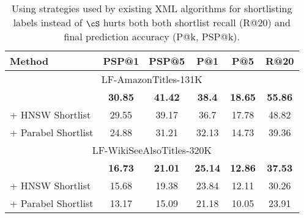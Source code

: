 \begin{table}
\caption{Using strategies used by existing XML algorithms for shortlisting labels instead of $\cS$ hurts both both shortlist recall (R@20) and final prediction accuracy (P@k, PSP@k).}
    \label{tab:sub:xmlclass}
    \centering
    \begin{tabular}{@{}l|cc|cc|c@{}}
        \toprule
        \textbf{Method}
        & \textbf{PSP@1}  & \textbf{PSP@5} & \textbf{P@1}  & \textbf{P@5} &\textbf{R@20}\\
        \midrule
\multicolumn{6}{c}{LF-AmazonTitles-131K}\\ \midrule					
\alg	 & \textbf{30.85}	 & \textbf{41.42}	 & \textbf{38.4}	 & \textbf{18.65}	 & \textbf{55.86} \\
\midrule
+ HNSW Shortlist	 & 29.55	 & 39.17	 & 36.7	 & 17.78	 & 48.82 \\
+ Parabel Shortlist	 & 24.88	 & 31.21	 & 32.13	 & 14.73	 & 39.36 \\
\midrule
\multicolumn{6}{c}{LF-WikiSeeAlsoTitles-320K}\\ \midrule			
\alg	 & \textbf{16.73}	 & \textbf{21.01}	 & \textbf{25.14}	 & \textbf{12.86}	 & \textbf{37.53} \\
\midrule
+ HNSW Shortlist	 & 15.68	 & 19.38	 & 23.84	 & 12.11	 & 30.26 \\
+ Parabel Shortlist	 & 13.17	 & 15.09	 & 21.18	 & 10.05	 & 23.91 \\
        \bottomrule
    \end{tabular}
\end{table}


